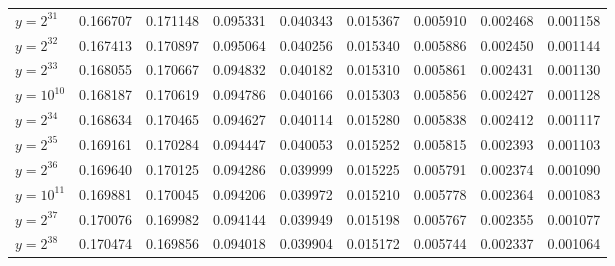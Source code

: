 \documentclass{article}
\theoremstyle{definition}
\begin{document}
\begin{table}[h!]
{\begin{tabular}{l|rrrrrrrr}
            $y = 2^{31}$             & 0.166707 & 0.171148              & 0.095331              & 0.040343              & 0.015367              & 0.005910              & 0.002468              & 0.001158              \\
            $y = 2^{32}$             & 0.167413 & 0.170897              & 0.095064              & 0.040256              & 0.015340              & 0.005886              & 0.002450              & 0.001144              \\
            $y = 2^{33}$             & 0.168055 & 0.170667              & 0.094832              & 0.040182              & 0.015310              & 0.005861              & 0.002431              & 0.001130              \\
            \hline
            $y = 10^{10}$            & 0.168187 & 0.170619              & 0.094786              & 0.040166              & 0.015303              & 0.005856              & 0.002427              & 0.001128              \\
            \hline
            $y = 2^{34}$             & 0.168634 & 0.170465              & 0.094627              & 0.040114              & 0.015280              & 0.005838              & 0.002412              & 0.001117              \\
            $y = 2^{35}$             & 0.169161 & 0.170284              & 0.094447              & 0.040053              & 0.015252              & 0.005815              & 0.002393              & 0.001103              \\
            $y = 2^{36}$             & 0.169640 & 0.170125              & 0.094286              & 0.039999              & 0.015225              & 0.005791              & 0.002374              & 0.001090              \\
            \hline
            $y = 10^{11}$            & 0.169881 & 0.170045              & 0.094206              & 0.039972              & 0.015210              & 0.005778              & 0.002364              & 0.001083              \\
            \hline
            $y = 2^{37}$             & 0.170076 & 0.169982              & 0.094144              & 0.039949              & 0.015198              & 0.005767              & 0.002355              & 0.001077              \\
            $y = 2^{38}$             & 0.170474 & 0.169856              & 0.094018              & 0.039904              & 0.015172              & 0.005744              & 0.002337              & 0.001064              \\

\end{tabular}}
\end{table}
\end{document}
